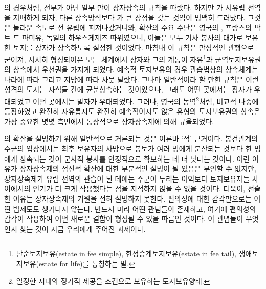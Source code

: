 의 경우처럼,
전부가 아닌 일부 만이 장자상속의 규칙을 따랐다.
하지만 가 서유럽 전역을 지배하게 되자,
다른 상속방식보다 가 큰 장점을 갖는 것임이 명백히 드러났다.
그것은 놀라운 속도로 전 유럽에 퍼져나갔거니와,
확산의 주요 수단은 영국의 ,
프랑스의 팍트 드 파미유,
독일의 하우스게제츠 따위였으니,
이들은 모두 기사 봉사의 대가로 보유한 토지를
장자가 상속하도록 설정한 것이었다.
마침내 이 규칙은 만성적인 관행으로 굳어져,
서서히 형성되어온 모든  체계에서
장자와 그의 계통이
자유\footnote{%
  단순토지보유(estate in fee simple),
  한정승계토지보유(estate in fee tail),
  생애토지보유(estate for life)를 통칭하는 말.
}과
군역토지보유권의 상속에서 우선권을 가지게 되었다.
예속적 토지보유의 경우 
관습법상의 상속체계는 나라에 따라 그리고 지방에 따라 사뭇 달랐다.
그나마 일반적이라 할 만한 규칙은 이런 성격의 토지는 자식들 간에
균분상속하는 것이었으나, 그래도 어떤 곳에서는
장자가 우대되었고 어떤 곳에서는 말자가 우대되었다.
그러나,
영국의 농역\footnote{%
  일정한 지대의 정기적 제공을 조건으로 보유하는 토지보유양태.
}처럼,
비교적 나중에 등장하였고 완전히 자유롭지도 완전히 예속적이지도 않은
유형의 토지보유권의 상속은 가장 중요한 몇몇 측면에서
통상적으로 장자상속제에 의해 규율되었다.

의 확산을 설명하기 위해 일반적으로 거론되는 것은
이른바 `적' 근거이다.
봉건관계의 주군의 입장에서는
최후 보유자의 사망으로
봉토가
여러 명에게 분산되는 것보다
한 명에게 상속되는 것이 군사적 봉사를 안정적으로 확보하는 데
더 낫다는 것이다.
이런 이유가 장자상속제의 점진적 확산에 대한 부분적인 설명이 될 있음은
부인할 수 없지만,
장자상속제가 유럽 전역의 관습이 된 데에는
주군이 누리는 이익보다 토지보유자들 사이에서의 인기가 더 크게
작용했다는 점을
지적하지 않을 수 없을 것이다.
더욱이, 전술한 이유는 장자상속제의 기원을 전혀 설명하지 못한다.
편의성에 대한 감각만으로는 어떤 법제도도 생겨나지 않는다.
반드시 미리 어떤 관념들이 존재하고, 여기에 편의성의 감각이 작용하여
어떤 새로운 결합이 형성될 수 있을 따름인 것이다.
이 관념들이 무엇인지 찾는 것이 지금 우리에게 주어진 과제이다.

